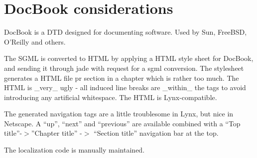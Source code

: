 
\section{DocBook considerations}

DocBook is a DTD designed for documenting software.  Used by Sun,
FreeBSD, O'Reilly and others.

The SGML is converted to HTML by applying a HTML style sheet for
DocBook, and sending it through jade with request for a sgml
conversion.  The stylesheet generates a HTML file pr section in a
chapter which is rather too much.  The HTML is \_very\_ ugly - all
induced line breaks are \_within\_ the tags to avoid introducing any
artificial whitespace.  The HTML is Lynx-compatible.

The generated navigation tags are a little troublesome in Lynx, but
nice in Netscape.  A ``up'', ``next'' and ``previous'' are available
combined with a ``Top title''-$>$''Chapter title'' -$>$ ``Section title''
navigation bar at the top.

The localization code is manually maintained.



